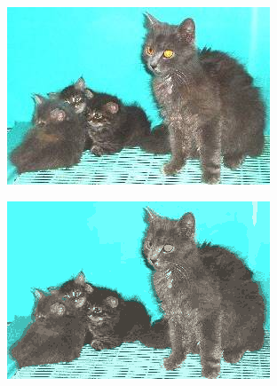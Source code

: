 \begin{figure}[htbp]
    \centering
    \caption{
        Case study: \texttt{cat-101.jpg}, $k=15$.
        Original image, reconstructed image using k-means, reconstruction error,
        and clusterings in sample space.
    }
    \begin{subfigure}[t]{0.32\textwidth}
        \includegraphics[width=\linewidth]{../../rust_code/data/kmeans/cat-101.jpg}
    \end{subfigure}
    \begin{subfigure}[t]{0.32\textwidth}
        \includegraphics[width=\linewidth]{../../python_code/plots/kmeans/cat-101/reconstruction.png}
    \end{subfigure}
    \begin{subfigure}[t]{0.32\textwidth}

\end{subfigure}
\end{figure}
